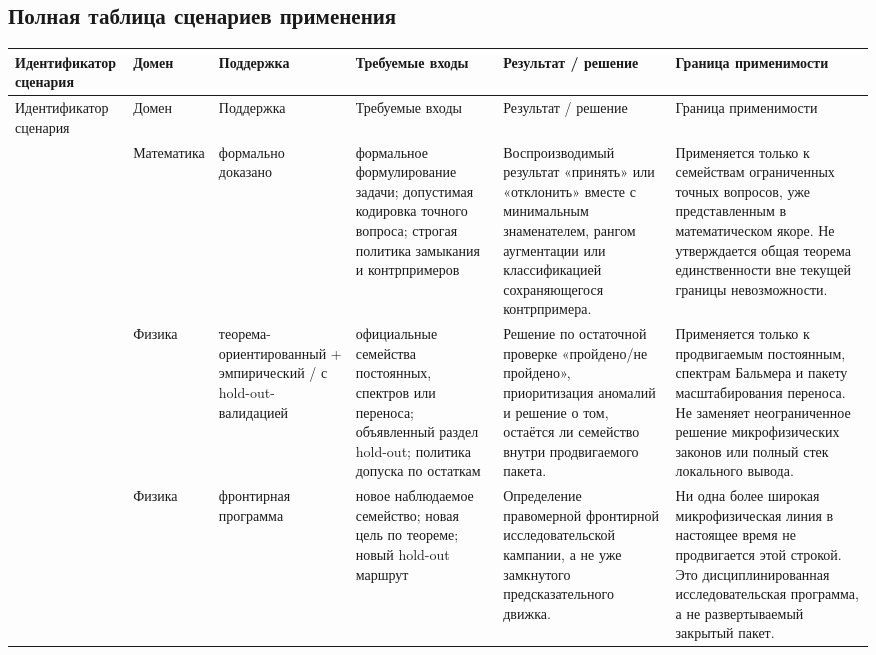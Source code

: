 
\begingroup
\scriptsize
\setlength{\tabcolsep}{2pt}

\subsection{Полная таблица сценариев применения}
\begin{longtable}{@{}L{0.13\textwidth}L{0.14\textwidth}L{0.12\textwidth}L{0.18\textwidth}L{0.17\textwidth}L{0.20\textwidth}@{}}
\toprule
Идентификатор сценария & Домен & Поддержка & Требуемые входы & Результат / решение & Граница применимости \\
\midrule
\endfirsthead
\toprule
Идентификатор сценария & Домен & Поддержка & Требуемые входы & Результат / решение & Граница применимости \\
\midrule
\endhead
{} & Математика & формально доказано & формальное формулирование задачи; \allowbreak допустимая кодировка точного вопроса; \allowbreak строгая политика замыкания и контрпримеров & Воспроизводимый результат «принять» или «отклонить» вместе с минимальным знаменателем, рангом аугментации или классификацией сохраняющегося контрпримера. & Применяется только к семействам ограниченных точных вопросов, уже представленным в математическом якоре. Не утверждается общая теорема единственности вне текущей границы невозможности. \\
 & Физика & теорема-ориентированный + эмпирический / с hold-out-валидацией & официальные семейства постоянных, спектров или переноса; \allowbreak объявленный раздел hold-out; \allowbreak политика допуска по остаткам & Решение по остаточной проверке «пройдено/не пройдено», приоритизация аномалий и решение о том, остаётся ли семейство внутри продвигаемого пакета. & Применяется только к продвигаемым постоянным, спектрам Бальмера и пакету масштабирования переноса. Не заменяет неограниченное решение микрофизических законов или полный стек локального вывода. \\
 & Физика & фронтирная программа & новое наблюдаемое семейство; \allowbreak новая цель по теореме; \allowbreak новый hold-out маршрут & Определение правомерной фронтирной исследовательской кампании, а не уже замкнутого предсказательного движка. & Ни одна более широкая микрофизическая линия в настоящее время не продвигается этой строкой. Это дисциплинированная исследовательская программа, а не развертываемый закрытый пакет. \\

\end{longtable}
